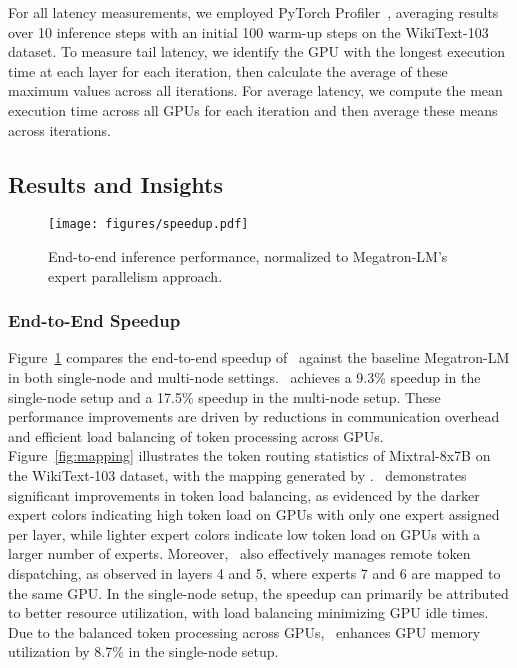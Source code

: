 %
For all latency measurements, we employed PyTorch Profiler~\cite{torchprof}, averaging results over 10 inference steps with an initial 100 warm-up steps on the WikiText-103 dataset.
%
To measure tail latency, we identify the GPU with the longest execution time at each layer for each iteration, then calculate the average of these maximum values across all iterations. 
%
For average latency, we compute the mean execution time across all GPUs for each iteration and then average these means across iterations.

\subsection{Results and Insights}


\begin{figure}
    \centering
    \texttt{[image: figures/speedup.pdf]}
    \vspace{-1.5em}
    \caption{End-to-end inference performance, normalized to Megatron-LM's expert parallelism approach.}
    \label{fig:speedup}
\end{figure}




\subsubsection{End-to-End Speedup}
%
Figure~\ref{fig:speedup} compares the end-to-end speedup of \expertune~against the baseline Megatron-LM in both single-node and multi-node settings.
%
\expertune~achieves a 9.3\% speedup in the single-node setup and a 17.5\% speedup in the multi-node setup.
%
These performance improvements are driven by reductions in communication overhead and efficient load balancing of token processing across GPUs.
%
Figure~\ref{fig:mapping} illustrates the token routing statistics of Mixtral-8x7B on the WikiText-103 dataset, with the mapping generated by \expertune. 
%
\expertune~demonstrates significant improvements in token load balancing, as evidenced by the darker expert colors indicating high token load on GPUs with only one expert assigned per layer, while lighter expert colors indicate low token load on GPUs with a larger number of experts.
%
Moreover, \expertune~also effectively manages remote token dispatching, as observed in layers 4 and 5, where experts 7 and 6 are mapped to the same GPU.
%
In the single-node setup, the speedup can primarily be attributed to better resource utilization, with load balancing minimizing GPU idle times.
%
Due to the balanced token processing across GPUs, \expertune~enhances GPU memory utilization by 8.7\% in the single-node setup.


